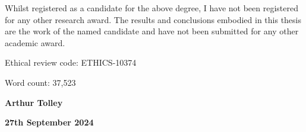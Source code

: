Whilst registered as a candidate for the above degree, I have not been registered for any other research award. The results and conclusions embodied in this thesis are the work of the named candidate and have not been submitted for any other academic award.

\vspace{\baselineskip}
\noindent Ethical review code: ETHICS-10374

\vspace{\baselineskip}
\noindent Word count: 37,523

\noindent\hrulefill

\vspace{\baselineskip}
\noindent \textbf{Arthur Tolley}

\noindent \textbf{27th September 2024}